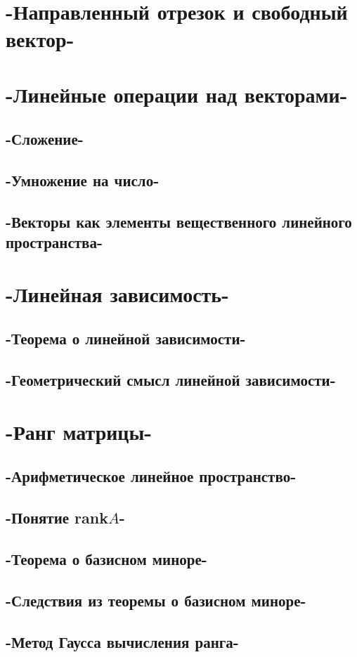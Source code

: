 \chapter{-Направленный отрезок и свободный вектор-}
\chapter{-Линейные операции над векторами-}
\section{-Сложение-}
\section{-Умножение на число-}
\section{-Векторы как элементы вещественного линейного пространства-}
\chapter{-Линейная зависимость-}
\section{-Теорема о линейной зависимости-}
\section{-Геометрический смысл линейной зависимости-}
\chapter{-Ранг матрицы-}
\section{-Арифметическое линейное пространство-}
\section{-Понятие rank$A$-}
\section{-Теорема о базисном миноре-}
\section{-Следствия из теоремы о базисном миноре-}
\section{-Метод Гаусса вычисления ранга-}
